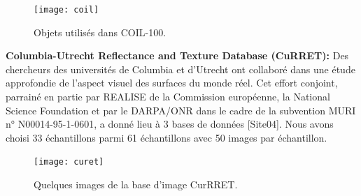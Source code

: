 \begin{figure}[H]
	\centering
	\texttt{[image: coil]} 
	\caption{Objets utilisés dans COIL-100.}
\end{figure}

\textbf{Columbia-Utrecht Reflectance and Texture Database (CuRRET):}
Des chercheurs des universités de Columbia et d'Utrecht ont collaboré dans une étude approfondie de l'aspect visuel des surfaces du monde réel. Cet effort conjoint, parrainé en partie par REALISE de la Commission européenne, la National Science Foundation et par le DARPA/ONR dans le cadre de la subvention MURI n° N00014-95-1-0601, a donné lieu à 3 bases de données [Site04]. Nous avons choisi 33 échantillons parmi 61 échantillons avec 50 images par échantillon.
\begin{figure}[H]
	\centering
	\texttt{[image: curet]} 
	\caption{Quelques images de la base d’image CurRRET.}
\end{figure}

%
%
%


